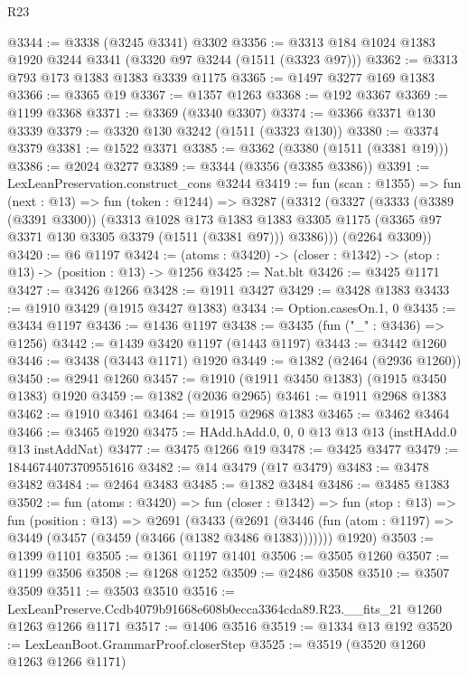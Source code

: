 \begin{lexlean}{R23}
\begin{coremodule}
@3344 := @3338 (@3245 @3341) @3302
@3356 := @3313 @184 @1024 @1383 @1920 @3244 @3341 (@3320 @97 @3244 (@1511 (@3323 @97)))
@3362 := @3313 @793 @173 @1383 @1383 @3339 @1175
@3365 := @1497 @3277 @169 @1383
@3366 := @3365 @19
@3367 := @1357 @1263
@3368 := @192 @3367
@3369 := @1199 @3368
@3371 := @3369 (@3340 @3307)
@3374 := @3366 @3371 @130 @3339
@3379 := @3320 @130 @3242 (@1511 (@3323 @130))
@3380 := @3374 @3379
@3381 := @1522 @3371
@3385 := @3362 (@3380 (@1511 (@3381 @19)))
@3386 := @2024 @3277
@3389 := @3344 (@3356 (@3385 @3386))
@3391 := LexLeanPreservation.construct_cons @3244
@3419 := fun (scan : @1355) =>
  fun (next : @13) =>
  fun (token : @1244) =>
  @3287
    (@3312
      (@3327
        (@3333
          (@3389 (@3391 @3300))
          (@3313
            @1028
            @173
            @1383
            @1383
            @3305
            @1175
            (@3365 @97 @3371 @130 @3305 @3379 (@1511 (@3381 @97)))
            @3386)))
      (@2264 @3309))
@3420 := @6 @1197
@3424 := (atoms : @3420) -> (closer : @1342) -> (stop : @13) -> (position : @13) -> @1256
@3425 := Nat.blt
@3426 := @3425 @1171
@3427 := @3426 @1266
@3428 := @1911 @3427
@3429 := @3428 @1383
@3433 := @1910 @3429 (@1915 @3427 @1383)
@3434 := Option.casesOn.{1, 0}
@3435 := @3434 @1197
@3436 := @1436 @1197
@3438 := @3435 (fun ("_" : @3436) => @1256)
@3442 := @1439 @3420 @1197 (@1443 @1197)
@3443 := @3442 @1260
@3446 := @3438 (@3443 @1171) @1920
@3449 := @1382 (@2464 (@2936 @1260))
@3450 := @2941 @1260
@3457 := @1910 (@1911 @3450 @1383) (@1915 @3450 @1383) @1920
@3459 := @1382 (@2036 @2965)
@3461 := @1911 @2968 @1383
@3462 := @1910 @3461
@3464 := @1915 @2968 @1383
@3465 := @3462 @3464
@3466 := @3465 @1920
@3475 := HAdd.hAdd.{0, 0, 0} @13 @13 @13 (instHAdd.{0} @13 instAddNat)
@3477 := @3475 @1266 @19
@3478 := @3425 @3477
@3479 := 18446744073709551616
@3482 := @14 @3479 (@17 @3479)
@3483 := @3478 @3482
@3484 := @2464 @3483
@3485 := @1382 @3484
@3486 := @3485 @1383
@3502 := fun (atoms : @3420) =>
  fun (closer : @1342) =>
  fun (stop : @13) =>
  fun (position : @13) =>
  @2691
    (@3433
      (@2691 (@3446 (fun (atom : @1197) => @3449 (@3457 (@3459 (@3466 (@1382 @3486 @1383)))))))
      @1920)
@3503 := @1399 @1101
@3505 := @1361 @1197 @1401
@3506 := @3505 @1260
@3507 := @1199 @3506
@3508 := @1268 @1252
@3509 := @2486 @3508
@3510 := @3507 @3509
@3511 := @3503 @3510
@3516 := LexLeanPreserve.Ccdb4079b91668e608b0ecca3364cda89.R23.__fits_21 @1260 @1263 @1266 @1171
@3517 := @1406 @3516
@3519 := @1334 @13 @192
@3520 := LexLeanBoot.GrammarProof.closerStep
@3525 := @3519 (@3520 @1260 @1263 @1266 @1171)

\end{coremodule}
\end{lexlean}
